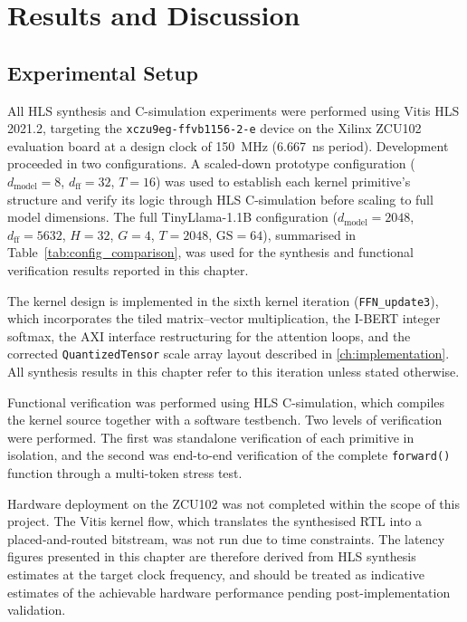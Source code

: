 
\chapter{Results and Discussion}
\label{ch:results}

\section{Experimental Setup}
\label{sec:exp_setup}

All HLS synthesis and C-simulation experiments were performed using Vitis HLS
2021.2, targeting the \texttt{xczu9eg-ffvb1156-2-e} device on the Xilinx
ZCU102 evaluation board at a design clock of \SI{150}{\mega\hertz}
(\SI{6.667}{\nano\second} period). Development proceeded in two configurations.
A scaled-down prototype configuration ($d_{\text{model}} = 8$,
$d_{\text{ff}} = 32$, $T = 16$) was used to establish each kernel
primitive's structure and verify its logic through HLS C-simulation before
scaling to full model dimensions. The full TinyLlama-1.1B configuration
($d_{\text{model}} = 2048$, $d_{\text{ff}} = 5632$, $H = 32$,
$G = 4$, $T = 2048$, $\text{GS} = 64$), summarised in
Table~\ref{tab:config_comparison}, was used for the synthesis and
functional verification results reported in this chapter.

The kernel design is implemented in the sixth kernel iteration
(\texttt{FFN\_update3}), which incorporates the tiled matrix--vector
multiplication, the I-BERT integer softmax, the AXI interface
restructuring for the attention loops, and the corrected
\texttt{QuantizedTensor} scale
array layout described in \cref{ch:implementation}. All synthesis results
in this chapter refer to this iteration unless stated otherwise.

Functional verification was performed using HLS C-simulation, which compiles
the kernel source together with a software testbench. Two levels of
verification were performed. The first was standalone verification of each
primitive in isolation, and the second was end-to-end verification of the
complete \texttt{forward()} function through a multi-token stress test.

Hardware deployment on the ZCU102 was not completed within the scope of this
project. The Vitis kernel flow, which translates the synthesised RTL
into a placed-and-routed bitstream, was not run due to time constraints. The
latency figures presented in this chapter are therefore derived from HLS
synthesis estimates at the target clock frequency, and should be treated as
indicative estimates of the achievable hardware performance pending
post-implementation validation.


